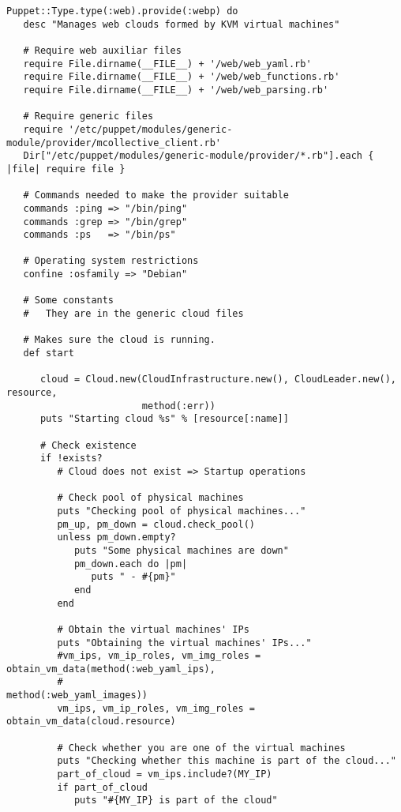 \begin{lstlisting}
Puppet::Type.type(:web).provide(:webp) do
   desc "Manages web clouds formed by KVM virtual machines"

   # Require web auxiliar files
   require File.dirname(__FILE__) + '/web/web_yaml.rb'
   require File.dirname(__FILE__) + '/web/web_functions.rb'
   require File.dirname(__FILE__) + '/web/web_parsing.rb'
   
   # Require generic files
   require '/etc/puppet/modules/generic-module/provider/mcollective_client.rb'
   Dir["/etc/puppet/modules/generic-module/provider/*.rb"].each { |file| require file }
   
   # Commands needed to make the provider suitable
   commands :ping => "/bin/ping"
   commands :grep => "/bin/grep"
   commands :ps   => "/bin/ps"
   
   # Operating system restrictions
   confine :osfamily => "Debian"

   # Some constants
   #   They are in the generic cloud files

   # Makes sure the cloud is running.
   def start
   
      cloud = Cloud.new(CloudInfrastructure.new(), CloudLeader.new(), resource,
                        method(:err))
      puts "Starting cloud %s" % [resource[:name]]
      
      # Check existence
      if !exists?
         # Cloud does not exist => Startup operations
         
         # Check pool of physical machines
         puts "Checking pool of physical machines..."
         pm_up, pm_down = cloud.check_pool()
         unless pm_down.empty?
            puts "Some physical machines are down"
            pm_down.each do |pm|
               puts " - #{pm}"
            end
         end
         
         # Obtain the virtual machines' IPs
         puts "Obtaining the virtual machines' IPs..."
         #vm_ips, vm_ip_roles, vm_img_roles = obtain_vm_data(method(:web_yaml_ips),
         #                                                   method(:web_yaml_images))
         vm_ips, vm_ip_roles, vm_img_roles = obtain_vm_data(cloud.resource)
         
         # Check whether you are one of the virtual machines
         puts "Checking whether this machine is part of the cloud..."
         part_of_cloud = vm_ips.include?(MY_IP)
         if part_of_cloud
            puts "#{MY_IP} is part of the cloud"
            

\end{lstlisting}
